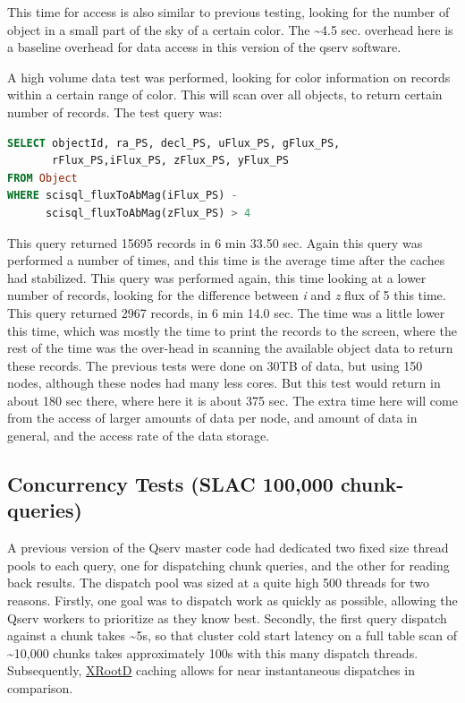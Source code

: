 \documentclass[DM,lsstdraft,toc]{lsstdoc}
\begin{document}
This time for access is also similar to previous testing, looking for
the number of object in a small part of the sky of a certain color. The
\textasciitilde{}4.5 sec. overhead here is a baseline overhead for data
access in this version of the qserv software.

A high volume data test was performed, looking for color information on
records within a certain range of color. This will scan over all
objects, to return certain number of records. The test query was:

\begin{lstlisting}[language=SQL]
SELECT objectId, ra_PS, decl_PS, uFlux_PS, gFlux_PS,
       rFlux_PS,iFlux_PS, zFlux_PS, yFlux_PS
FROM Object
WHERE scisql_fluxToAbMag(iFlux_PS) -
      scisql_fluxToAbMag(zFlux_PS) > 4
\end{lstlisting}

This query returned 15695 records in 6 min 33.50 sec. Again this query
was performed a number of times, and this time is the average time after
the caches had stabilized. This query was performed again, this time
looking at a lower number of records, looking for the difference between
\emph{i} and \emph{z} flux of 5 this time. This query returned 2967
records, in 6 min 14.0 sec. The time was a little lower this time, which
was mostly the time to print the records to the screen, where the rest
of the time was the over-head in scanning the available object data to
return these records. The previous tests were done on 30TB of data, but
using 150 nodes, although these nodes had many less cores. But this test
would return in about 180 sec there, where here it is about 375 sec. The
extra time here will come from the access of larger amounts of data per
node, and amount of data in general, and the access rate of the data
storage.

\subsection{Concurrency Tests (SLAC 100,000
chunk-queries)}\label{concurrency-tests-slac-100000-chunk-queries}

A previous version of the Qserv master code had dedicated two fixed size
thread pools to each query, one for dispatching chunk queries, and the
other for reading back results. The dispatch pool was sized at a quite
high 500 threads for two reasons. Firstly, one goal was to dispatch work
as quickly as possible, allowing the Qserv workers to prioritize as they
know best. Secondly, the first query dispatch against a chunk takes
\textasciitilde{}5s, so that cluster cold start latency on a full table
scan of \textasciitilde{}10,000 chunks takes approximately 100s with
this many dispatch threads. Subsequently,
\href{http://xrootd.org}{XRootD} caching allows for near instantaneous
dispatches in comparison.
\end{document}

